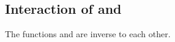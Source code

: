\subsection{Interaction of \peek and \poke}

The functions \peek and \poke are inverse to each other.

